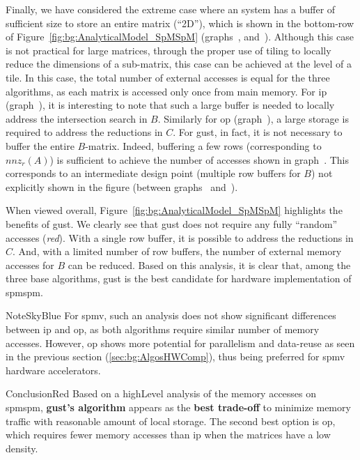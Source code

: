 Finally, we have considered the extreme case where an system has a buffer of sufficient size to store an entire matrix (``2D''), which is shown in the bottom-row of Figure~\ref{fig:bg:AnalyticalModel_SpMSpM} (graphs~,  and~).
Although this case is not practical for large matrices, through the proper use of \gls{tiling} to locally reduce the dimensions of a sub-matrix, this case can be achieved at the level of a \gls{tile}.
In this case, the total number of external accesses is equal for the three algorithms, as each matrix is accessed only once from main memory.
For \acrshort{ip} (graph~), it is interesting to note that such a large buffer is needed to locally address the \gls{intersection} search in $B$.
Similarly for \acrshort{op} (graph~), a large storage is required to address the \glspl{reduction} in $C$.
For \acrshort{gust}, in fact, it is not necessary to buffer the entire $B$-matrix.
Indeed, buffering a few rows (corresponding to $nnz_r(A)$) is sufficient to achieve the number of accesses shown in graph~.
This corresponds to an intermediate design point (multiple row buffers for $B$) not explicitly shown in the figure (between graphs~ and~).

When viewed overall, Figure~\ref{fig:bg:AnalyticalModel_SpMSpM} highlights the benefits of \acrshort{gust}.
We clearly see that \acrshort{gust} does not require any fully ``random'' accesses (\textit{red}).
With a single row buffer, it is possible to address the \glspl{reduction} in $C$.
And, with a limited number of row buffers, the number of external memory accesses for $B$ can be reduced.
Based on this analysis, it is clear that, among the three base algorithms, \acrshort{gust} is the best candidate for hardware implementation of \acrshort{spmspm}.

\begin{highlight}{Note}{SkyBlue}
    For \acrshort{spmv}, such an analysis does not show significant differences between \acrshort{ip} and \acrshort{op}, as both algorithms require similar number of memory accesses.
    However, \acrshort{op} shows more potential for parallelism and data-reuse as seen in the previous section (\ref{sec:bg:AlgosHWComp}), thus being preferred for \acrshort{spmv} hardware accelerators.
\end{highlight}

\begin{highlight}{Conclusion}{Red}
    Based on a \gls{highLevel} analysis of the memory accesses on \acrshort{spmspm}, \textbf{\acrlong{gust}'s algorithm} appears as the \textbf{best trade-off} to minimize memory traffic with reasonable amount of local storage.
    The second best option is \acrshort{op}, which requires fewer memory accesses than \acrshort{ip} when the matrices have a low density.
\end{highlight}